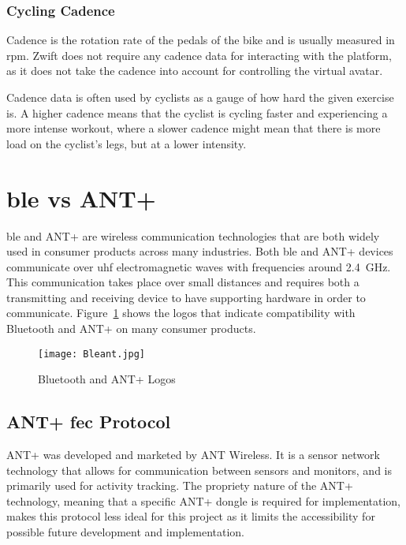 \subsubsection{Cycling Cadence}
Cadence is the rotation rate of the pedals of the bike and is usually measured in \ac{rpm}. Zwift does not require any cadence data for interacting with the platform, as it does not take the cadence into account for controlling the virtual avatar. 

Cadence data is often used by cyclists as a gauge of how hard the given exercise is. A higher cadence means that the cyclist is cycling faster and experiencing a more intense workout, where a slower cadence might mean that there is more load on the cyclist's legs, but at a lower intensity. \citep[2022]{Zwift:2022}

\section{\acf{ble} vs ANT+}
\label{sec:ant}

\ac{ble} and ANT+ are wireless communication technologies that are both widely used in consumer products across many industries. Both \ac{ble} and ANT+ devices communicate over \ac{uhf} electromagnetic waves with frequencies around \SI{2.4}{\giga\hertz}. This communication takes place over small distances and requires both a transmitting and receiving device to have supporting hardware in order to communicate. Figure~\ref{fig:bleant} shows the logos that indicate compatibility with Bluetooth and ANT+ on many consumer products. \citep{Bromley:2022}

\begin{figure}[H]
	\begin{center}
		\texttt{[image: Bleant.jpg]}
		\caption{Bluetooth and ANT+ Logos}
		\label{fig:bleant}
		\citep[2022]{yamaha:2022}
	\end{center}
\end{figure}

\subsection{ANT+ \acl{fec} Protocol}

ANT+ was developed and marketed by ANT Wireless. It is a sensor network technology that allows for communication between sensors and monitors, and is primarily used for activity tracking. The propriety nature of the ANT+ technology, meaning that a specific ANT+ dongle is required for implementation, makes this protocol less ideal for this project as it limits the accessibility for possible future development and implementation. \citep{Bromley:2022}


